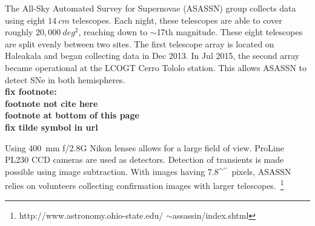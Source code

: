 \documentclass[aps,prb,twocolumn,superscriptaddress]{revtex4-1}
\def\arcsec{\ifmmode^{\prime\prime}\else$^{\prime\prime}$\fi}
\begin{document}
\indent The All-Sky Automated Survey for Supernovae (ASASSN) group 
collects data using eight $14~cm$ telescopes. Each night, these  
telescopes are able to cover roughly $20,000~deg^{2}$, reaching 
down to $\sim$17th magnitude.
These eight telescopes are split evenly between two sites.
The first telescope array is located on Haleakala and began 
collecting data in Dec 2013. In Jul 2015, the second %
array became operational at the LCOGT Cerro Tololo station. 
This allows ASASSN to detect SNe in both 
hemispheres.~\cite{asn_data}
~\\{\bf fix footnote:\\
\indent footnote not cite here\\
\indent footnote at bottom of this page\\
\indent fix tilde symbol in url
}



\indent Using 400~mm f/2.8G Nikon lenses allows for a large field of 
view. ProLine PL230 CCD cameras are used as detectors. Detection of 
transients is made possible using image subtraction. With images 
having 7.8\arcsec\ pixels, ASASSN relies on volunteers collecting  
confirmation images with 
larger telescopes.~\footnote{\label{foot:asn} http://www.astronomy.ohio-state.edu/ $\sim$assassin/index.shtml}
\end{document}
